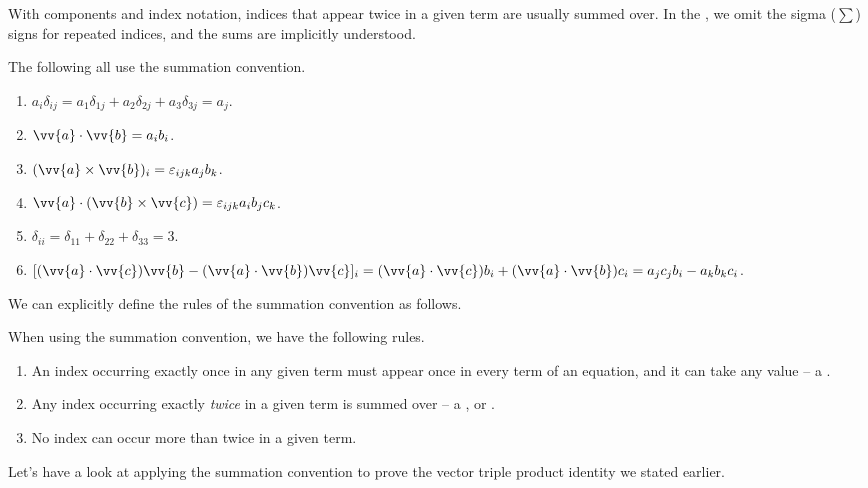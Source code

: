 With components and index notation, indices that appear twice in a given term are usually summed over. In the , we omit the sigma ($\sum$) signs for repeated indices, and the sums are implicitly understood.

\begin{example}
    The following all use the summation convention.
    \begin{enumerate}[label=(\roman*)]
        \item $a_i \delta_{ij} = a_1 \delta_{1j} + a_2 \delta_{2j} + a_3\delta_{3j} = a_j$.
        \item $\vv{a} \cdot \vv{b} = a_i b_i$.
        \item $(\vv{a} \times \vv{b})_i= \varepsilon_{ijk}a_j b_k$.
        \item $\vv{a} \cdot (\vv{b} \times \vv{c}) = \varepsilon_{ijk} a_i b_j c_k$.
        \item $\delta_{ii} = \delta_{11} + \delta_{22} + \delta_{33} = 3$.
        \item $[(\vv{a} \cdot \vv{c})\vv{b} - (\vv{a} \cdot \vv{b})\vv{c}]_i = (\vv{a} \cdot \vv{c})b_i + (\vv{a} \cdot \vv{b})c_i = a_j c_j b_i - a_k b_k c_i$.
    \end{enumerate}
\end{example}

We can explicitly define the rules of the summation convention as follows.

\begin{definition}
    When using the summation convention, we have the following rules.
    \begin{enumerate}[label=(\roman*)]
        \item An index occurring exactly once in any given term must appear once in every term of an equation, and it can take any value -- a .
        \item Any index occurring exactly \emph{twice} in a given term is summed over -- a ,  or .
        \item No index can occur more than twice in a given term.
    \end{enumerate}
\end{definition}

Let's have a look at applying the summation convention to prove the vector triple product identity we stated earlier.

